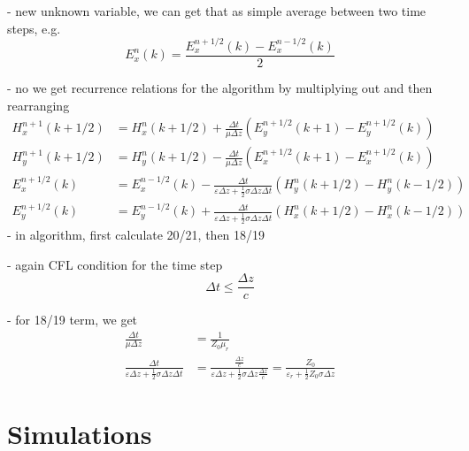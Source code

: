 \documentclass[]{report}
\begin{document}
- new unknown variable, we can get that as simple average between two time steps, e.g.
\begin{equation}
	E_x^n(k) = \frac{E_x^{n+1/2}(k)-E_x^{n-1/2}(k)}{2}
\end{equation}

- no we get recurrence relations for the algorithm by multiplying out and then rearranging
\begin{align}
	H_x^{n+1}(k+1/2) &= H_x^{n}(k+1/2) + \frac{\Delta t}{\mu \Delta z}\left( E_y^{n+1/2}(k+1)-E_y^{n+1/2}(k) \right) \\
	H_y^{n+1}(k+1/2) &= H_y^{n}(k+1/2) - \frac{\Delta t}{\mu \Delta z}\left( E_x^{n+1/2}(k+1)-E_x^{n+1/2}(k) \right) \\
	E_x^{n+1/2}(k) &= E_x^{n-1/2}(k) - \frac{\Delta t}{\varepsilon \Delta z + \frac{1}{2}\sigma \Delta z \Delta t} \left( H_y^{n}(k+1/2)-H_y^{n}(k-1/2) \right) \\
	E_y^{n+1/2}(k) &= E_y^{n-1/2}(k) + \frac{\Delta t}{\varepsilon \Delta z + \frac{1}{2}\sigma \Delta z \Delta t} \left( H_x^{n}(k+1/2)-H_x^{n}(k-1/2) \right)
\end{align}
- in algorithm, first calculate 20/21, then 18/19

- again CFL condition for the time step
\begin{equation}
	\Delta t \leq \frac{\Delta z}{c}
\end{equation}

- for 18/19 term, we get
\begin{align}
	\frac{\Delta t}{\mu \Delta z} &= \frac{1}{Z_0 \mu_r} \\
	\frac{\Delta t}{\varepsilon \Delta z + \frac{1}{2}\sigma \Delta z \Delta t} &= \frac{\frac{\Delta z}{c}}{\varepsilon \Delta z + \frac{1}{2}\sigma \Delta z \frac{\Delta z}{c}} = \frac{Z_0}{\varepsilon_r + \frac{1}{2} Z_0 \sigma \Delta z}
\end{align}


\section{Simulations}
\end{document}
